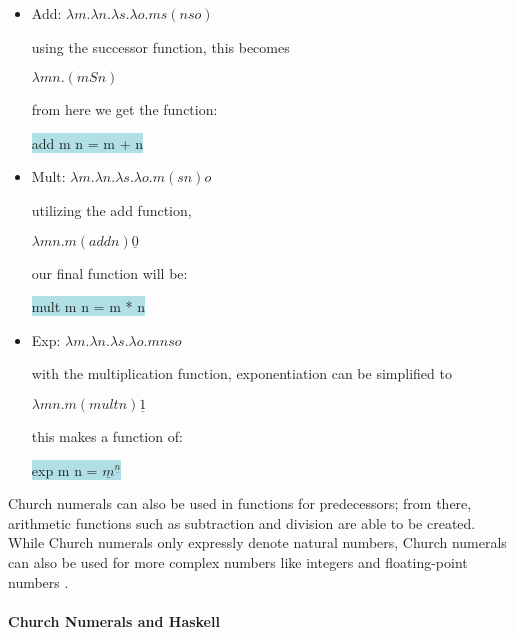 \documentclass{article}
\begin{document}
\begin{itemize}

\item Add: $\lambda m. \lambda n. \lambda s. \lambda o. ms(nso)$

using the successor function, this becomes

$\lambda mn. (mSn)$

from here we get the function: 

\colorbox{powderblue}{add m n = m + n} \cite{CR} \newline

\item Mult: $\lambda m. \lambda n. \lambda s. \lambda o. m (sn)o$

utilizing the add function, 

$\lambda mn. m(add n) \underline{0}$

our final function will be:

\colorbox{powderblue}{mult m n = m * n} \cite{CR} \newline

\item Exp: $\lambda m. \lambda n. \lambda s. \lambda o. mnso$

with the multiplication function, exponentiation can be simplified to

$\lambda mn. m(mult n) \underline{1}$

this makes a function of:

\colorbox{powderblue}{exp m n = $\underline{m}^{\underline{n}}$} \cite{CR} \newline

\end{itemize}

Church numerals can also be used in functions for predecessors; from there, arithmetic functions such as subtraction and division are able to be created. While Church numerals only expressly denote natural numbers, Church numerals can also be used for more complex numbers like integers and floating-point numbers \cite{TLC}. 

\paragraph{Church Numerals and Haskell}

\subparagraph{}
\end{document}
